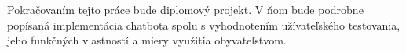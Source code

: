 \documentclass{ExcelAtFIT}
\begin{document}
Pokračovaním tejto práce bude diplomový projekt. V ňom bude podrobne popísaná implementácia chatbota spolu s vyhodnotením užívateľského testovania, jeho funkčných vlastností a miery využitia obyvateľstvom.




\end{document}
